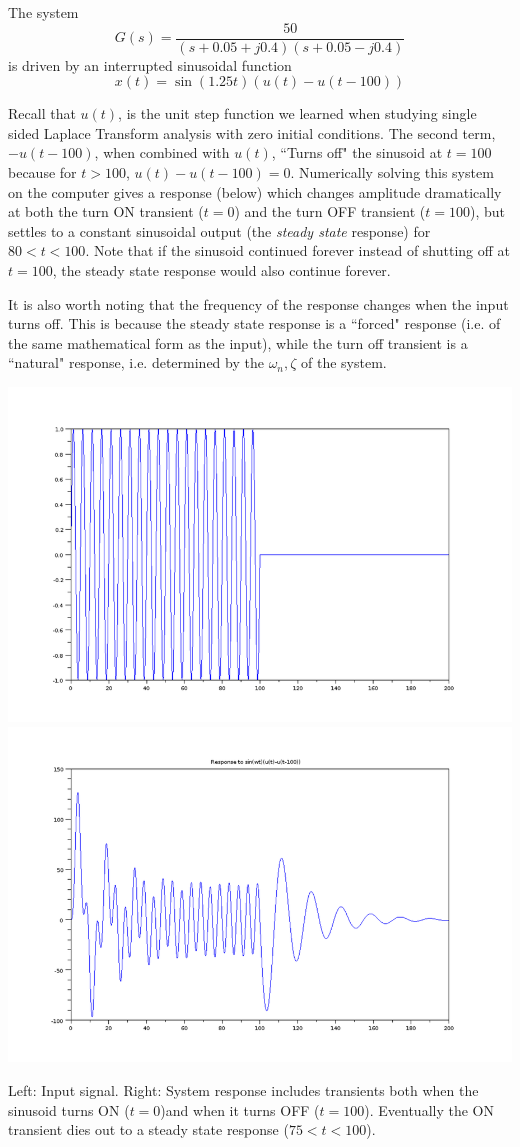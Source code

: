\begin{Example}
  The system
\[
G(s) = \frac{50}{(s+0.05+j0.4)(s+0.05-j0.4)}
\]
is driven by an interrupted  sinusoidal function
\[
x(t) = \sin(1.25t)(u(t)-u(t-100))
\]

Recall that $u(t)$, is the unit step function we learned when studying single sided Laplace Transform analysis with zero initial conditions.  The second term, $-u(t-100)$, when combined with $u(t)$, ``Turns off" the sinusoid at $t=100$ because for $t>100$, $u(t)-u(t-100) = 0$.
Numerically solving this system on the computer gives a response (below) which changes amplitude dramatically at both the turn ON transient ($t=0$) and the turn OFF transient ($t=100$), but settles to a constant sinusoidal output (the {\it steady state} response) for $80< t < 100$.  Note that if the sinusoid continued forever instead of shutting off at $t=100$, the steady state response would also continue forever.

It is also worth noting that the frequency of the response changes when the input turns off.   This is because the steady state response is a ``forced" response (i.e. of the same mathematical form as the input), while the turn off transient is a ``natural" response, i.e. determined by the $\omega_n, \zeta$ of the system.


\includegraphics[width=3.in]{figs05/sinusoid_input_stepa.png}
\includegraphics[width=3.in]{figs05/sinusoid_transienta.png}

Left:  Input signal. Right: System response includes transients both when the sinusoid turns ON ($t=0$)and when it turns OFF ($t=100$).
Eventually the ON transient dies out to a steady state response ($75<t<100$).

\end{Example}

